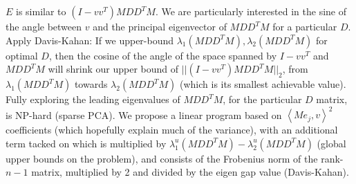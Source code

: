 \documentclass{article}
\begin{document}
$E$ is similar to $(I-vv^T)MD D^T M$. We are particularly interested in the sine of the angle between $v$ and the principal eigenvector of $MD D^T M$ for a particular $D$. Apply Davis-Kahan: If we upper-bound $\lambda_1(MD D^T M), \lambda_2(MD D^T M)$ for optimal $D$, then the cosine of the angle of the space spanned by $I-vv^T$ and $MD D^T M$ will shrink our upper bound of $||(I-vv^T) MD D^T M||_2$, from $\lambda_1(MD D^T M)$ towards $\lambda_2(MD D^T M)$ (which is its smallest achievable value). Fully exploring the leading eigenvalues of $MD D^T M$, for the particular $D$ matrix, is NP-hard (sparse PCA). We propose a linear program based on $\left< Me_j, v\right>^2$ coefficients (which hopefully explain much of the variance), with an additional term tacked on which is multiplied by $\lambda_1^u(MDD^TM)-\lambda_2^u(MDD^TM)$ (global upper bounds on the problem), and consists of the Frobenius norm of the rank-$n-1$ matrix, multiplied by 2 and divided by the eigen gap value (Davis-Kahan).

\end{document}

